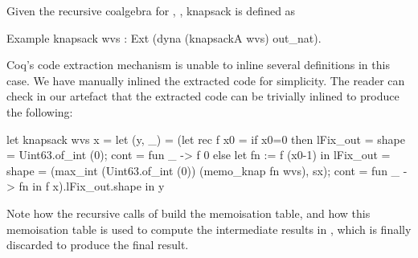 \documentclass[a4paper,anonymous, UKenglish,cleveref, autoref, thm-restate]{lipics-v2021}
\begin{document}
Given the recursive coalgebra for , , knapsack is defined
as
\begin{coqcode}
Example knapsack wvs : Ext (dyna (knapsackA wvs) out_nat).
\end{coqcode}
Coq's code extraction mechanism is unable to inline several definitions in this
case. We have manually inlined the extracted code for simplicity. The reader
can check in our artefact that the extracted code can be trivially
inlined to produce the following:
\begin{ocamlcode}
let knapsack wvs x = let (y, _) = (let rec f x0 =
      if x0=0 then
        { lFix_out = {shape = Uint63.of_int (0); cont  = fun _ -> f 0 } }
      else let fn := f (x0-1) in { lFix_out = {
           shape = (max_int (Uint63.of_int (0)) (memo_knap fn wvs), sx);
           cont = fun _ -> fn } }
     in f x).lFix_out.shape in y
\end{ocamlcode}
Note how the recursive calls of  build the memoisation table, and how
this memoisation table is used to compute the intermediate results in
, which is finally discarded to produce the final result.
\end{document}
